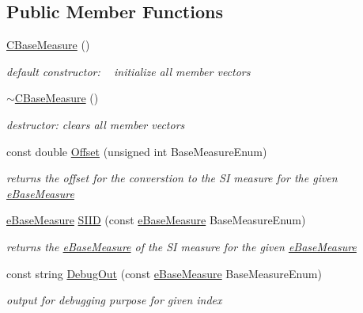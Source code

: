 \subsection*{Public Member Functions}
\begin{DoxyCompactItemize}
\item 
\hyperlink{classCBaseMeasure_a6a369b1e556d95a938b0e75647b5a602}{C\+Base\+Measure} ()
\begin{DoxyCompactList}\small\item\em default constructor\+: ~\newline
 initialize all member vectors \end{DoxyCompactList}\item 
\hyperlink{classCBaseMeasure_aca2735196a7e6e6524d73327d95d4a19}{$\sim$\+C\+Base\+Measure} ()
\begin{DoxyCompactList}\small\item\em destructor\+: clears all member vectors \end{DoxyCompactList}\item 
const double \hyperlink{classCBaseMeasure_abae752b654d90bcf0fa795cc9d4fb0ac}{Offset} (unsigned int Base\+Measure\+Enum)
\begin{DoxyCompactList}\small\item\em returns the offset for the converstion to the SI measure for the given \hyperlink{BaseMeasure_8h_ac90e5164ccf1f0d648fba7e94b229a11}{e\+Base\+Measure} \end{DoxyCompactList}\item 
\hyperlink{BaseMeasure_8h_ac90e5164ccf1f0d648fba7e94b229a11}{e\+Base\+Measure} \hyperlink{classCBaseMeasure_a4a2040454722a288e24babbacef30d01}{S\+I\+ID} (const \hyperlink{BaseMeasure_8h_ac90e5164ccf1f0d648fba7e94b229a11}{e\+Base\+Measure} Base\+Measure\+Enum)
\begin{DoxyCompactList}\small\item\em returns the \hyperlink{BaseMeasure_8h_ac90e5164ccf1f0d648fba7e94b229a11}{e\+Base\+Measure} of the SI measure for the given \hyperlink{BaseMeasure_8h_ac90e5164ccf1f0d648fba7e94b229a11}{e\+Base\+Measure} \end{DoxyCompactList}\item 
const string \hyperlink{classCBaseMeasure_acb998b7f15d9aa3530b2cb0b910177fd}{Debug\+Out} (const \hyperlink{BaseMeasure_8h_ac90e5164ccf1f0d648fba7e94b229a11}{e\+Base\+Measure} Base\+Measure\+Enum)
\begin{DoxyCompactList}\small\item\em output for debugging purpose for given index \end{DoxyCompactList}\item 

\end{DoxyCompactItemize}
